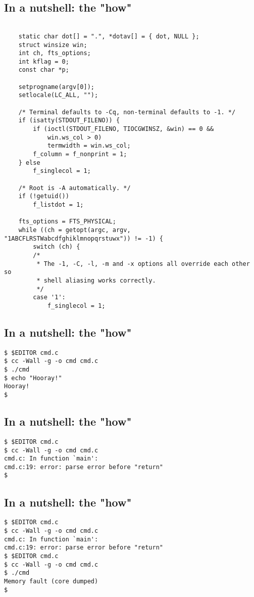 \documentclass[xga]{xdvislides}
\begin{document}
\subsection{In a nutshell: the "how"}
\small
\begin{verbatim}

    static char dot[] = ".", *dotav[] = { dot, NULL };
    struct winsize win;
    int ch, fts_options;
    int kflag = 0;
    const char *p;

    setprogname(argv[0]);
    setlocale(LC_ALL, "");

    /* Terminal defaults to -Cq, non-terminal defaults to -1. */
    if (isatty(STDOUT_FILENO)) {
        if (ioctl(STDOUT_FILENO, TIOCGWINSZ, &win) == 0 &&
            win.ws_col > 0)
            termwidth = win.ws_col;
        f_column = f_nonprint = 1;
    } else
        f_singlecol = 1;

    /* Root is -A automatically. */
    if (!getuid())
        f_listdot = 1;

    fts_options = FTS_PHYSICAL;
    while ((ch = getopt(argc, argv, "1ABCFLRSTWabcdfghiklmnopqrstuwx")) != -1) {
        switch (ch) {
        /*
         * The -1, -C, -l, -m and -x options all override each other so
         * shell aliasing works correctly.
         */
        case '1':
            f_singlecol = 1;
\end{verbatim}
\Normalsize

\subsection{In a nutshell: the "how"}
\begin{verbatim}
$ $EDITOR cmd.c
$ cc -Wall -g -o cmd cmd.c
$ ./cmd
$ echo "Hooray!"
Hooray!
$
\end{verbatim}

\subsection{In a nutshell: the "how"}
\begin{verbatim}
$ $EDITOR cmd.c
$ cc -Wall -g -o cmd cmd.c
cmd.c: In function `main':
cmd.c:19: error: parse error before "return"
$
\end{verbatim}

\subsection{In a nutshell: the "how"}
\begin{verbatim}
$ $EDITOR cmd.c
$ cc -Wall -g -o cmd cmd.c
cmd.c: In function `main':
cmd.c:19: error: parse error before "return"
$ $EDITOR cmd.c
$ cc -Wall -g -o cmd cmd.c
$ ./cmd
Memory fault (core dumped)
$
\end{verbatim}
\end{document}

